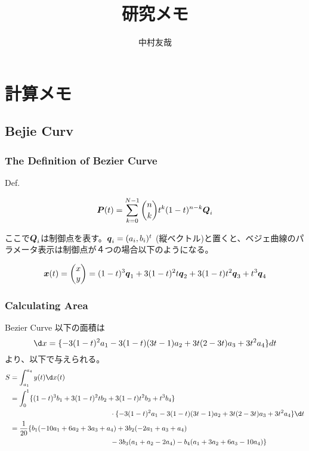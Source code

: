 \documentclass{ltjsarticle}
\title{研究メモ}
\author{中村友哉}
\begin{document}
\maketitle
\section{計算メモ}
\subsection{Bejie Curv}
\subsubsection{The Definition of Bezier Curve}
Def.

\begin{equation}
  \vb*{P}(t)=\sum_{k=0}^{N-1}\binom{n}{k}t^k(1-t)^{n-k}\vb*{Q}_i
\end{equation}

ここで$\vb*{Q}_i$は制御点を表す。$\vb*{q}_i=(a_i,b_i)^t$ (縦ベクトル)と置くと、ベジェ曲線のパラメータ表示は制御点が４つの場合以下のようになる。

\begin{equation}
  \vb*{x}(t)=
  \begin{pmatrix}
    x \\ y  
  \end{pmatrix}
  =(1-t)^3\vb*{q}_1+3(1-t)^2t\vb*{q}_2+3(1-t)t^2\vb*{q}_3+t^3\vb*{q}_4
\end{equation}
\subsubsection{Calculating Area}
Bezier Curve 以下の面積は
\begin{equation}
  \d x=\{-3(1-t)^2a_1-3(1-t)(3t-1)a_2+3t(2-3t)a_3+3t^2a_4\}dt
\end{equation}
より、以下で与えられる。
\begin{equation}
  \begin{split}
    S&=\int_{a_1}^{a_4}y(t)\d x(t)\\
    &=\int_{0}^{1}\{(1-t)^3b_1+3(1-t)^2tb_2+3(1-t)t^2b_3+t^3b_4\}\\
    & \hspace{5cm}\cdot \{-3(1-t)^2a_1-3(1-t)(3t-1)a_2+3t(2-3t)a_3+3t^2a_4\}\d t\\
    &=\frac{1}{20}\{b_1(-10a_1+6a_2+3a_3+a_4)+3b_2(-2a_1+a_3+a_4)\\
    & \hspace{5cm}-3b_3(a_1+a_2-2a_4)-b_4(a_1+3a_2+6a_3-10a_4)\}\\
  \end{split}
\end{equation}
\end{document}

